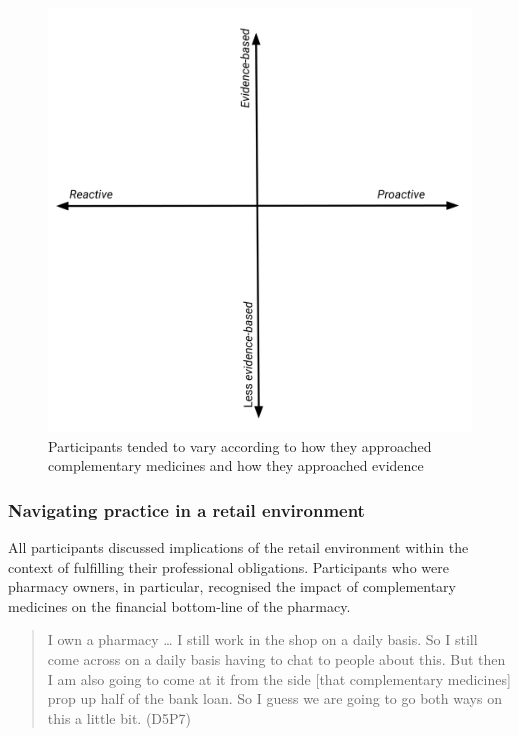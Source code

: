 \documentclass[12pt,]{article}
\begin{document}
\begin{figure}
\centering
\includegraphics{files/CMEthics_context3.png}
\caption{Participants tended to vary according to how they approached
complementary medicines and how they approached evidence
\label{context3}}
\end{figure}

\subsubsection{Navigating practice in a retail
environment}\label{navigating-practice-in-a-retail-environment}

All participants discussed implications of the retail environment within
the context of fulfilling their professional obligations. Participants
who were pharmacy owners, in particular, recognised the impact of
complementary medicines on the financial bottom-line of the pharmacy.

\begin{quote}
I own a pharmacy \ldots{} I still work in the shop on a daily basis. So
I still come across on a daily basis having to chat to people about
this. But then I am also going to come at it from the side {[}that
complementary medicines{]} prop up half of the bank loan. So I guess we
are going to go both ways on this a little bit. (D5P7)
\end{quote}
\end{document}
